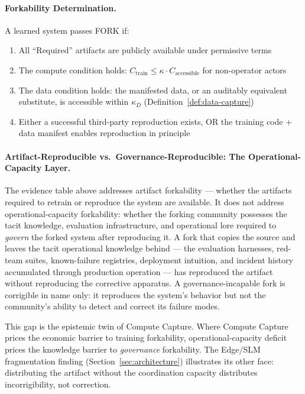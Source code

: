 \documentclass{article}
\theoremstyle{definition}
\begin{document}
\paragraph{Forkability Determination.} A learned system passes FORK if:
\begin{enumerate}[noitemsep]
    \item All ``Required'' artifacts are publicly available under permissive terms
    \item The compute condition holds: $C_{\text{train}} \leq \kappa \cdot C_{\text{accessible}}$ for non-operator actors
    \item The data condition holds: the manifested data, or an auditably equivalent substitute, is accessible within $\kappa_D$ (Definition~\ref{def:data-capture})
    \item Either a successful third-party reproduction exists, OR the training code + data manifest enables reproduction in principle
\end{enumerate}

\paragraph{Artifact-Reproducible vs.\ Governance-Reproducible: The Operational-Capacity Layer.}
The evidence table above addresses artifact forkability --- whether the artifacts required to retrain or reproduce the system are available. It does not address operational-capacity forkability: whether the forking community possesses the tacit knowledge, evaluation infrastructure, and operational lore required to \textit{govern} the forked system after reproducing it. A fork that copies the source and leaves the tacit operational knowledge behind --- the evaluation harnesses, red-team suites, known-failure registries, deployment intuition, and incident history accumulated through production operation --- has reproduced the artifact without reproducing the corrective apparatus. A governance-incapable fork is corrigible in name only: it reproduces the system's behavior but not the community's ability to detect and correct its failure modes.

This gap is the epistemic twin of Compute Capture. Where Compute Capture prices the economic barrier to training forkability, operational-capacity deficit prices the knowledge barrier to \textit{governance} forkability. The Edge/SLM fragmentation finding (Section~\ref{sec:architecture}) illustrates its other face: distributing the artifact without the coordination capacity distributes incorrigibility, not correction.
\end{document}
